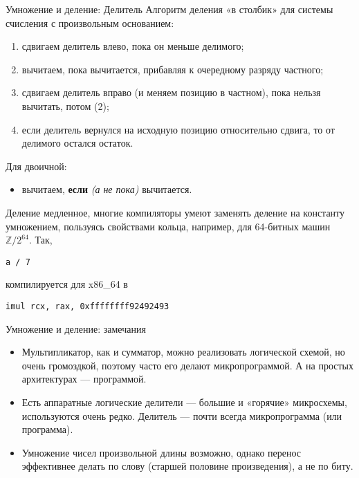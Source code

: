 \documentclass[xetex,aspectratio=43]{beamer}
\begin{document}
\begin{frame}[fragile]{Умножение и деление: Делитель}
    Алгоритм деления «в столбик» для системы счисления с произвольным
    основанием:

    \begin{enumerate}
        \item
        сдвигаем делитель влево, пока он меньше делимого;
        \item
        вычитаем, пока вычитается, прибавляя к очередному разряду частного;
        \item
        сдвигаем делитель вправо (и меняем позицию в частном), пока нельзя
        вычитать, потом (2);
        \item
        если делитель вернулся на исходную позицию относительно сдвига, то от
        делимого остался остаток.
    \end{enumerate}

    Для двоичной:

    \begin{itemize}
        \tightlist
        \item
        вычитаем, \textbf{если} \emph{(а не пока)} вычитается.
    \end{itemize}

    \pause

    Деление медленное, многие компиляторы умеют заменять деление на
    константу умножением, пользуясь свойствами кольца, например, для 64-битных машин
    \(\mathbb{Z}/{2^{64}}\). Так,

    \texttt{a / 7}

    компилируется для x86\_64 в

    \texttt{imul rcx, rax, 0xffffffff92492493}
\end{frame}

\begin{frame}{Умножение и деление: замечания}
        \begin{itemize}
            \item
            Мультипликатор, как и сумматор, можно реализовать логической схемой,
            но очень громоздкой, поэтому часто его делают микропрограммой. А на
            простых архитектурах --- программой.
            \item
            Есть аппаратные логические делители --- большие и «горячие»
            микросхемы, используются очень редко. Делитель --- почти всегда
            микропрограмма (или программа).
            \item
            Умножение чисел произвольной длины возможно, однако перенос
            эффективнее делать по слову (старшей половине произведения), а не по
            биту.
        \end{itemize}
\end{frame}
\end{document}

